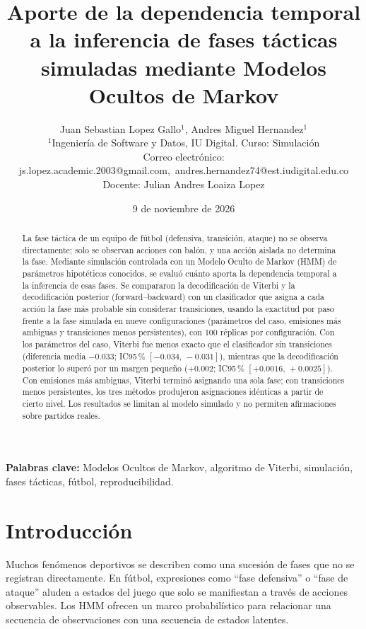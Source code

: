 \documentclass[11pt,a4paper]{article}
\title{Aporte de la dependencia temporal a la inferencia de fases tácticas
simuladas mediante Modelos Ocultos de Markov}
\author{
Juan Sebastian Lopez Gallo$^{1}$, Andres Miguel Hernandez$^{1}$\\[4pt]
\small $^{1}$Ingeniería de Software y Datos, IU Digital. Curso: Simulación\\
\small Correo electrónico: js.lopez.academic.2003@gmail.com,\
andres.hernandez74@est.iudigital.edu.co\\
\small Docente: Julian Andres Loaiza Lopez
}
\date{9 de noviembre de 2026}
\begin{document}
\maketitle

\begin{abstract}
La fase táctica de un equipo de fútbol (defensiva, transición, ataque) no se
observa directamente; solo se observan acciones con balón, y una acción aislada
no determina la fase. Mediante simulación controlada con un Modelo Oculto de
Markov (HMM) de parámetros hipotéticos conocidos, se evaluó cuánto aporta la
dependencia temporal a la inferencia de esas fases. Se compararon la
decodificación de Viterbi y la decodificación posterior (forward--backward) con
un clasificador que asigna a cada acción la fase más probable sin considerar
transiciones, usando la exactitud por paso frente a la fase simulada en nueve
configuraciones (parámetros del caso, emisiones más ambiguas y transiciones
menos persistentes), con 100 réplicas por configuración. Con los parámetros del
caso, Viterbi fue menos exacto que el clasificador sin transiciones (diferencia
media $-0.033$; IC95\,\% $[-0.034,\,-0.031]$), mientras que la decodificación
posterior lo superó por un margen pequeño ($+0.002$; IC95\,\%
$[+0.0016,\,+0.0025]$). Con emisiones más ambiguas, Viterbi terminó asignando una
sola fase; con transiciones menos persistentes, los tres métodos produjeron
asignaciones idénticas a partir de cierto nivel. Los resultados se limitan al
modelo simulado y no permiten afirmaciones sobre partidos reales.
\end{abstract}

\noindent\textbf{Palabras clave:} Modelos Ocultos de Markov, algoritmo de Viterbi,
simulación, fases tácticas, fútbol, reproducibilidad.

\section{Introducción}

Muchos fenómenos deportivos se describen como una sucesión de fases que no se
registran directamente. En fútbol, expresiones como ``fase defensiva'' o
``fase de ataque'' aluden a estados del juego que solo se manifiestan a través
de acciones observables. Los HMM ofrecen un marco probabilístico para relacionar
una secuencia de observaciones con una secuencia de estados latentes.
\end{document}
